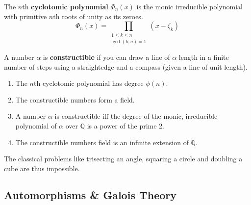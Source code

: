 \begin{definition}
	The $n$th \textbf{cyclotomic polynomial} $\Phi_n(x)$ is the monic irreducible polynomial with primitive $n$th roots of unity as its zeroes.
	$$ \Phi_n(x) = \prod_{\substack{1 \le k \le n \\ \gcd(k,n)=1}} \!\!\!\!\!\left(x-\zeta_k\right)$$
\end{definition}

\begin{definition}
	A number $\alpha$ is \textbf{constructible} if you can draw a line of $\alpha$ length in a finite number of steps using a straightedge and a compass (given a line of unit length).
\end{definition}

\begin{enumerate}
	\item The $n$th cyclotomic polynomial has degree $\phi(n)$.
	\item The constructible numbers form a field.
	\item A number $\alpha$ is constructible iff the degree of the monic, irreducible polynomial of $\alpha$ over $\mathbb{Q}$ is a power of the prime $2$.
	\item The constructible numbers field is an infinite extension of $\mathbb{Q}$.
\end{enumerate}
	The classical problems like trisecting an angle, squaring a circle and doubling a cube are thus impossible.


\subsection{Automorphisms \& Galois Theory}
